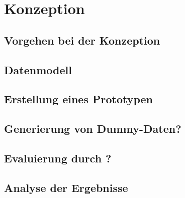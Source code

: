 \chapter{Konzeption}
\label{konzept}
\minitoc\pagebreak
\lipsum[1-60]
\section{Vorgehen bei der Konzeption}
\section{Datenmodell}
\section{Erstellung eines Prototypen}
\section{Generierung von Dummy-Daten?}
\section{Evaluierung durch ?}
\section{Analyse der Ergebnisse}